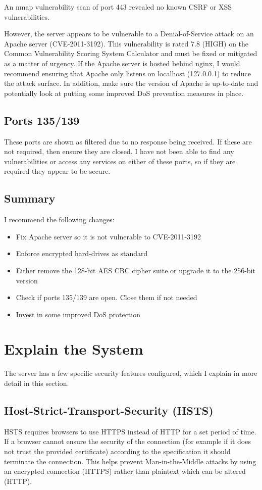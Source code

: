 \documentclass[12pt]{article}
\begin{document}
  An nmap vulnerability scan of port 443 revealed no known CSRF or XSS vulnerabilities.

  However, the server appears to be vulnerable to a Denial-of-Service attack on an Apache server (CVE-2011-3192).
  This vulnerability is rated 7.8 (HIGH) on the Common Vulnerability Scoring System Calculator and must be fixed or mitigated as a matter of urgency.
  If the Apache server is hosted behind nginx, I would recommend ensuring that Apache only listens on localhost (127.0.0.1) to reduce the attack surface.
  In addition, make sure the version of Apache is up-to-date and potentially look at putting some improved DoS prevention measures in place.

  \subsection{Ports 135/139}
  These ports are shown as filtered due to no response being received.
  If these are not required, then ensure they are closed.
  I have not been able to find any vulnerabilities or access any services on either of these ports, so if they are required they appear to be secure.

  \subsection{Summary}
  I recommend the following changes:
  \begin{itemize}
    \item Fix Apache server so it is not vulnerable to CVE-2011-3192
    \item Enforce encrypted hard-drives as standard
    \item Either remove the 128-bit AES CBC cipher suite or upgrade it to the 256-bit version
    \item Check if ports 135/139 are open. Close them if not needed
    \item Invest in some improved DoS protection
  \end{itemize}

  \section{Explain the System}

  The server has a few specific security features configured, which I explain in more detail in this section.

  \subsection{Host-Strict-Transport-Security (HSTS)}
  HSTS requires browsers to use HTTPS instead of HTTP for a set period of time.
  If a browser cannot ensure the security of the connection (for example if it does not trust the provided certificate) according to the specification it should terminate the connection.
  This helps prevent Man-in-the-Middle attacks by using an encrypted connection (HTTPS) rather than plaintext which can be altered (HTTP).
\end{document}
